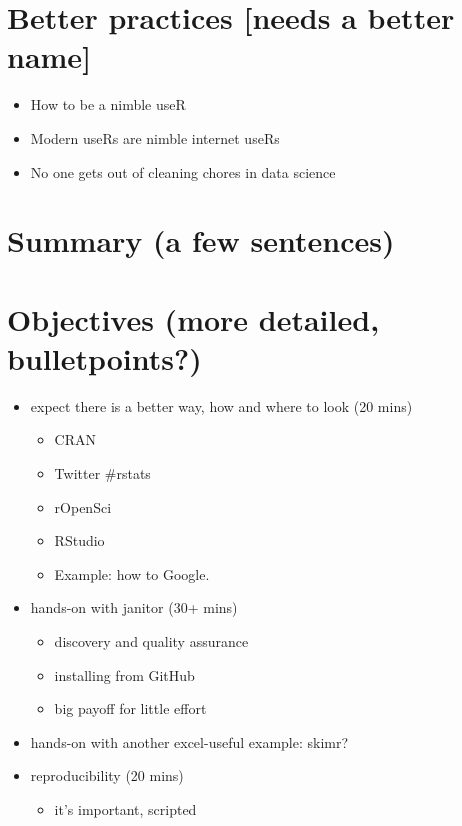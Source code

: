 \documentclass[]{book}
\providecommand{\tightlist}{%
  \setlength{\itemsep}{0pt}\setlength{\parskip}{0pt}}
\begin{document}
\hypertarget{better-practices-needs-a-better-name}{%
\section{Better practices {[}needs a better name{]}}\label{better-practices-needs-a-better-name}}

\begin{itemize}
\tightlist
\item
  How to be a nimble useR
\item
  Modern useRs are nimble internet useRs
\item
  No one gets out of cleaning chores in data science
\end{itemize}

\hypertarget{summary-a-few-sentences-5}{%
\section{Summary (a few sentences)}\label{summary-a-few-sentences-5}}

\hypertarget{objectives-more-detailed-bulletpoints-3}{%
\section{Objectives (more detailed, bulletpoints?)}\label{objectives-more-detailed-bulletpoints-3}}

\begin{itemize}
\tightlist
\item
  expect there is a better way, how and where to look (20 mins)

  \begin{itemize}
  \tightlist
  \item
    CRAN
  \item
    Twitter \#rstats
  \item
    rOpenSci
  \item
    RStudio
  \item
    Example: how to Google.
  \end{itemize}
\item
  hands-on with janitor (30+ mins)

  \begin{itemize}
  \tightlist
  \item
    discovery and quality assurance
  \item
    installing from GitHub
  \item
    big payoff for little effort
  \end{itemize}
\item
  hands-on with another excel-useful example: skimr?\\
\item
  reproducibility (20 mins)

  \begin{itemize}
  \tightlist
  \item
    it's important, scripted
  \end{itemize}
\end{itemize}
\end{document}
